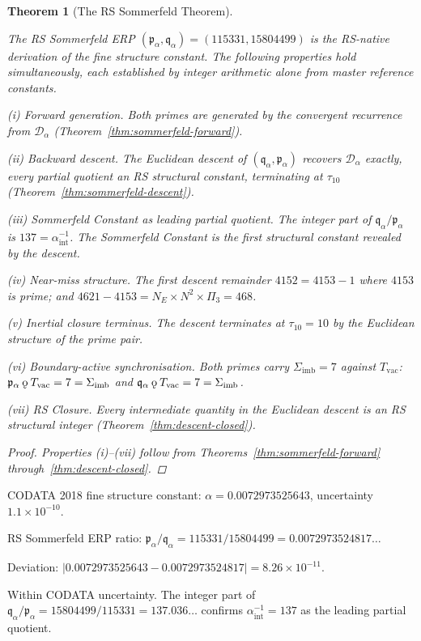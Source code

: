 \documentclass[11pt,letterpaper]{article}
\theoremstyle{plain}
\newtheorem{theorem}{Theorem}[section]
\theoremstyle{definition}
\theoremstyle{remark}
\newcommand{\koppa}{\mathbin{\text{\rm\k{o}}}}
\newcommand{\Sigimb}{\Sigma_{\mathrm{imb}}}
\newcommand{\Tvac}{T_{\mathrm{vac}}}
\newcommand{\tauX}{\tau_{10}}
\newcommand{\Pithree}{\Pi_3}
\newcommand{\aSC}{\alpha^{-1}_{\mathrm{int}}}
\newcommand{\pa}{\mathfrak{p}_\alpha}
\newcommand{\qa}{\mathfrak{q}_\alpha}
\newcommand{\Da}{\mathcal{D}_\alpha}
\begin{document}
\begin{theorem}[The RS Sommerfeld Theorem]\label{thm:sommerfeld}
\begin{rsbox}
The RS Sommerfeld ERP $(\pa,\qa)=(115331,15804499)$ is the RS-native
derivation of the fine structure constant.  The following properties
hold simultaneously, each established by integer arithmetic alone
from master reference constants.

\emph{(i) Forward generation.}  Both primes are generated by the
convergent recurrence from $\Da$
(Theorem~\ref{thm:sommerfeld-forward}).

\emph{(ii) Backward descent.}  The Euclidean descent of $(\qa,\pa)$
recovers $\Da$ exactly, every partial quotient an RS structural
constant, terminating at $\tauX$ (Theorem~\ref{thm:sommerfeld-descent}).

\emph{(iii) Sommerfeld Constant as leading partial quotient.}  The
integer part of $\qa/\pa$ is $137=\aSC$.  The Sommerfeld Constant
is the first structural constant revealed by the descent.

\emph{(iv) Near-miss structure.}  The first descent remainder
$4152=4153-1$ where $4153$ is prime; and $4621-4153=N_E\times
N^2\times\Pithree=468$.

\emph{(v) Inertial closure terminus.}  The descent terminates at
$\tauX=10$ by the Euclidean structure of the prime pair.

\emph{(vi) Boundary-active synchronisation.}  Both primes carry
$\Sigimb=7$ against $\Tvac$: $\pa\koppa\Tvac=7=\Sigimb$ and
$\qa\koppa\Tvac=7=\Sigimb$.

\emph{(vii) RS Closure.}  Every intermediate quantity in the
Euclidean descent is an RS structural integer
(Theorem~\ref{thm:descent-closed}).
\end{rsbox}
\begin{proof}
Properties (i)–(vii) follow from
Theorems~\ref{thm:sommerfeld-forward} through~\ref{thm:descent-closed}.
\end{proof}
\end{theorem}

\begin{verifybox}
CODATA 2018 fine structure constant:
$\alpha=0.0072973525643$, uncertainty $1.1\times10^{-10}$.

RS Sommerfeld ERP ratio:
$\pa/\qa=115331/15804499=0.0072973524817\ldots$

Deviation: $|0.0072973525643-0.0072973524817|=8.26\times10^{-11}$.

Within CODATA uncertainty.  The integer part of
$\qa/\pa=15804499/115331=137.036\ldots$ confirms $\aSC=137$ as
the leading partial quotient.
\end{verifybox}
\end{document}

